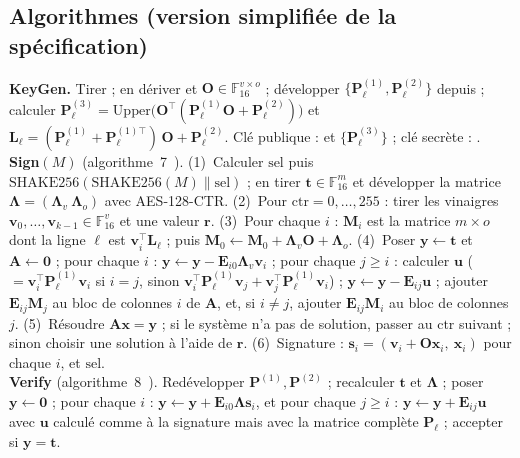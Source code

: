\subsection{Algorithmes (version simplifiée de la spécification)}
\begin{encadre}
\textbf{KeyGen.} Tirer  ; en dériver  et $\mathbf{O}\in\mathbb{F}_{16}^{v\times o}$ ; développer $\{\mathbf{P}^{(1)}_\ell,\mathbf{P}^{(2)}_\ell\}$ depuis  ; calculer $\mathbf{P}^{(3)}_\ell=\mathrm{Upper}\big(\mathbf{O}^{\top}(\mathbf{P}^{(1)}_\ell\mathbf{O}+\mathbf{P}^{(2)}_\ell)\big)$ et $\mathbf{L}_\ell=(\mathbf{P}^{(1)}_\ell+\mathbf{P}^{(1)\top}_\ell)\,\mathbf{O}+\mathbf{P}^{(2)}_\ell$. Clé publique :  et $\{\mathbf{P}^{(3)}_\ell\}$ ; clé secrète : .\\[2pt]
\textbf{Sign}$(M)$ (algorithme~7~\cite{mayospec}). (1)~Calculer $\text{sel}$ puis $\mathrm{SHAKE256}(\mathrm{SHAKE256}(M)\|\text{sel})$ ; en tirer $\mathbf{t}\in\mathbb{F}_{16}^m$ et développer la matrice $\boldsymbol{\Lambda}=(\boldsymbol{\Lambda}_v\ \boldsymbol{\Lambda}_o)$ avec AES-128-CTR. (2)~Pour $\text{ctr}=0,\dots,255$ : tirer les vinaigres $\mathbf{v}_0,\dots,\mathbf{v}_{k-1}\in\mathbb{F}_{16}^{v}$ et une valeur $\mathbf{r}$. (3)~Pour chaque $i$ : $\mathbf{M}_i$ est la matrice $m\times o$ dont la ligne $\ell$ est $\mathbf{v}_i^{\top}\mathbf{L}_\ell$ ; puis $\mathbf{M}_0\leftarrow\mathbf{M}_0+\boldsymbol{\Lambda}_v\mathbf{O}+\boldsymbol{\Lambda}_o$. (4)~Poser $\mathbf{y}\leftarrow\mathbf{t}$ et $\mathbf{A}\leftarrow\mathbf{0}$ ; pour chaque $i$ : $\mathbf{y}\leftarrow\mathbf{y}-\mathbf{E}_{i0}\boldsymbol{\Lambda}_v\mathbf{v}_i$ ; pour chaque $j\ge i$ : calculer $\mathbf{u}$ ($=\mathbf{v}_i^{\top}\mathbf{P}^{(1)}_\ell\mathbf{v}_i$ si $i=j$, sinon $\mathbf{v}_i^{\top}\mathbf{P}^{(1)}_\ell\mathbf{v}_j+\mathbf{v}_j^{\top}\mathbf{P}^{(1)}_\ell\mathbf{v}_i$) ; $\mathbf{y}\leftarrow\mathbf{y}-\mathbf{E}_{ij}\mathbf{u}$ ; ajouter $\mathbf{E}_{ij}\mathbf{M}_j$ au bloc de colonnes $i$ de $\mathbf{A}$, et, si $i\ne j$, ajouter $\mathbf{E}_{ij}\mathbf{M}_i$ au bloc de colonnes $j$. (5)~Résoudre $\mathbf{A}\mathbf{x}=\mathbf{y}$ ; si le système n'a pas de solution, passer au $\text{ctr}$ suivant ; sinon choisir une solution à l'aide de $\mathbf{r}$. (6)~Signature : $\mathbf{s}_i=(\mathbf{v}_i+\mathbf{O}\mathbf{x}_i,\ \mathbf{x}_i)$ pour chaque $i$, et $\text{sel}$.\\[2pt]
\textbf{Verify} (algorithme~8~\cite{mayospec}). Redévelopper $\mathbf{P}^{(1)},\mathbf{P}^{(2)}$ ; recalculer $\mathbf{t}$ et $\boldsymbol{\Lambda}$ ; poser $\mathbf{y}\leftarrow\mathbf{0}$ ; pour chaque $i$ : $\mathbf{y}\leftarrow\mathbf{y}+\mathbf{E}_{i0}\boldsymbol{\Lambda}\mathbf{s}_i$, et pour chaque $j\ge i$ : $\mathbf{y}\leftarrow\mathbf{y}+\mathbf{E}_{ij}\mathbf{u}$ avec $\mathbf{u}$ calculé comme à la signature mais avec la matrice complète $\mathbf{P}_\ell$ ; accepter si $\mathbf{y}=\mathbf{t}$.
\end{encadre}
